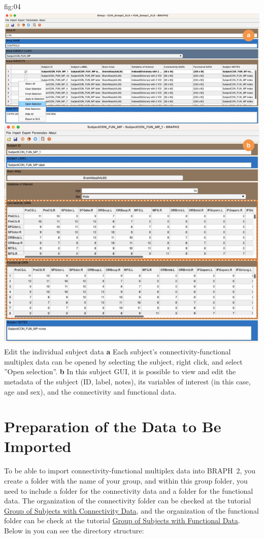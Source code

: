 \documentclass[justified]{tufte-handout}
\begin{document}
	{fig:04}
	{\includegraphics{fig04.jpg}
	}
	{Edit the individual subject data}
	{
	{\bf a}  Each subject's connectivity-functional multiplex data can be opened by selecting the subject, right click, and select ''Open selection''. 
	{\bf b} In this subject GUI, it is possible to view and edit the metadata of the subject (ID, label, notes), its variables of interest (in this case, age and sex), and the connectivity and functional data. 
	}


\clearpage
\section{Preparation of the Data to Be Imported}

To be able to import connectivity-functional multiplex data into BRAPH~2, you create a folder with the name of your group, and within this group folder, you need to include a folder for the connectivity data and a folder for the functional data. The organization of the connectivity folder can be checked at the tutorial \href{https://github.com/braph-software/BRAPH-2/tree/develop/tutorials/general/tut_gr_con}{Group of Subjects with Connectivity Data}, and the organization of the functional folder can be check at the tutorial \href{https://github.com/braph-software/BRAPH-2/tree/develop/tutorials/general/tut_gr_fun}{Group of Subjects with Functional Data}. Below in  you can see the directory structure:
\end{document}
